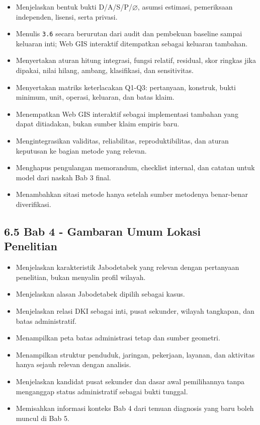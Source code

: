 \documentclass[
  indonesian,
  11pt,
]{article}
\providecommand{\tightlist}{%
  \setlength{\itemsep}{0pt}\setlength{\parskip}{0pt}}
\renewcommand{\tightlist}{%
  \setlength{\itemsep}{0.22em}%
  \setlength{\parskip}{0pt}%
}
\begin{document}
\begin{itemize}
\item[$\square$]
  Menjelaskan bentuk bukti D/A/S/P/\(\varnothing\), asumsi estimasi,
  pemeriksaan independen, lisensi, serta privasi.
\item[$\square$]
  Menulis \texttt{3.6} secara berurutan dari audit dan pembekuan
  baseline sampai keluaran inti; Web GIS interaktif ditempatkan sebagai
  keluaran tambahan.
\item[$\square$]
  Menyertakan aturan hitung integrasi, fungsi relatif, residual, skor
  ringkas jika dipakai, nilai hilang, ambang, klasifikasi, dan
  sensitivitas.
\item[$\square$]
  Menyertakan matriks keterlacakan Q1-Q3: pertanyaan, konstruk, bukti
  minimum, unit, operasi, keluaran, dan batas klaim.
\item[$\square$]
  Menempatkan Web GIS interaktif sebagai implementasi tambahan yang
  dapat ditiadakan, bukan sumber klaim empiris baru.
\item[$\square$]
  Mengintegrasikan validitas, reliabilitas, reproduktibilitas, dan
  aturan keputusan ke bagian metode yang relevan.
\item[$\square$]
  Menghapus pengulangan memorandum, checklist internal, dan catatan
  untuk model dari naskah Bab 3 final.
\item[$\square$]
  Menambahkan sitasi metode hanya setelah sumber metodenya benar-benar
  diverifikasi.
\end{itemize}

\subsection{6.5 Bab 4 - Gambaran Umum Lokasi
Penelitian}\label{bab-4---gambaran-umum-lokasi-penelitian}

\begin{itemize}
\tightlist
\item[$\square$]
  Menjelaskan karakteristik Jabodetabek yang relevan dengan pertanyaan
  penelitian, bukan menyalin profil wilayah.
\item[$\square$]
  Menjelaskan alasan Jabodetabek dipilih sebagai kasus.
\item[$\square$]
  Menjelaskan relasi DKI sebagai inti, pusat sekunder, wilayah
  tangkapan, dan batas administratif.
\item[$\square$]
  Menampilkan peta batas administrasi tetap dan sumber geometri.
\item[$\square$]
  Menampilkan struktur penduduk, jaringan, pekerjaan, layanan, dan
  aktivitas hanya sejauh relevan dengan analisis.
\item[$\square$]
  Menjelaskan kandidat pusat sekunder dan dasar awal pemilihannya tanpa
  menganggap status administratif sebagai bukti tunggal.
\item[$\square$]
  Memisahkan informasi konteks Bab 4 dari temuan diagnosis yang baru
  boleh muncul di Bab 5.
\end{itemize}
\end{document}
